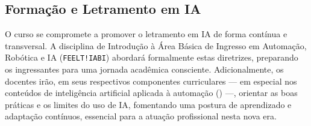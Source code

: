 \subsection{Formação e Letramento em IA}

O curso se compromete a promover o letramento em IA de forma contínua e transversal. A disciplina de Introdução à Área Básica de Ingresso em Automação, Robótica e IA (\texttt{FEELT!IABI}) abordará formalmente estas diretrizes, preparando os ingressantes para uma jornada acadêmica consciente. Adicionalmente, os docentes irão, em seus respectivos componentes curriculares — em especial nos conteúdos de inteligência artificial aplicada à automação (\ppcenfasecurricular) —, orientar as boas práticas e os limites do uso de IA, fomentando uma postura de aprendizado e adaptação contínuos, essencial para a atuação profissional nesta nova era.
